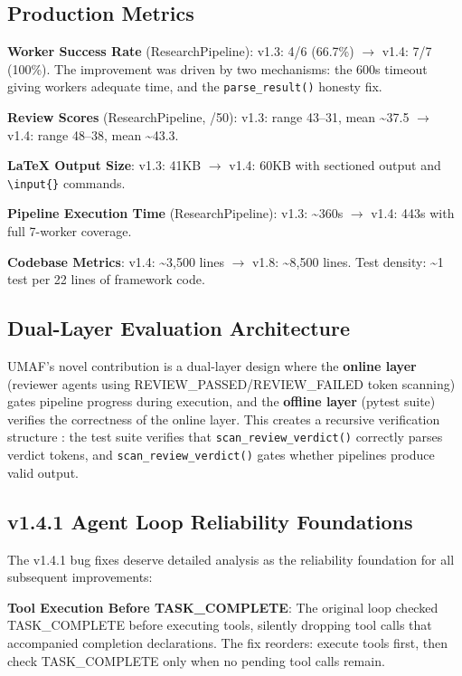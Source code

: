 \subsection{Production Metrics}

\textbf{Worker Success Rate} (ResearchPipeline): v1.3: 4/6 (66.7\%) $\rightarrow$ v1.4: 7/7 (100\%). The improvement was driven by two mechanisms: the 600s timeout giving workers adequate time, and the \texttt{parse\_result()} honesty fix.

\textbf{Review Scores} (ResearchPipeline, /50): v1.3: range 43--31, mean \textasciitilde37.5 $\rightarrow$ v1.4: range 48--38, mean \textasciitilde43.3.

\textbf{LaTeX Output Size}: v1.3: 41KB $\rightarrow$ v1.4: 60KB with sectioned output and \texttt{\textbackslash input\{\}} commands.

\textbf{Pipeline Execution Time} (ResearchPipeline): v1.3: \textasciitilde360s $\rightarrow$ v1.4: 443s with full 7-worker coverage.

\textbf{Codebase Metrics}: v1.4: \textasciitilde3,500 lines $\rightarrow$ v1.8: \textasciitilde8,500 lines. Test density: \textasciitilde1 test per 22 lines of framework code.

\subsection{Dual-Layer Evaluation Architecture}

UMAF's novel contribution \cite{multiagentbench,collabovercooked} is a dual-layer design where the \textbf{online layer} (reviewer agents using REVIEW\_PASSED/REVIEW\_FAILED token scanning) gates pipeline progress during execution, and the \textbf{offline layer} (pytest suite) verifies the correctness of the online layer. This creates a recursive verification structure \cite{reflexion,selfrefine}: the test suite verifies that \texttt{scan\_review\_verdict()} correctly parses verdict tokens, and \texttt{scan\_review\_verdict()} gates whether pipelines produce valid output.

\subsection{v1.4.1 Agent Loop Reliability Foundations}

The v1.4.1 bug fixes deserve detailed analysis as the reliability foundation for all subsequent improvements:

\raggedright
\textbf{Tool Execution Before TASK\_COMPLETE}: The original loop checked TASK\_COMPLETE before executing tools, silently dropping tool calls that accompanied completion declarations. The fix reorders: execute tools first, then check TASK\_COMPLETE only when no pending tool calls remain.

